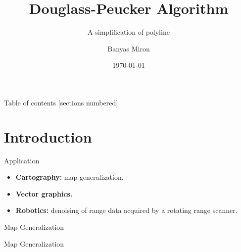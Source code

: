 \documentclass[10pt]{beamer}
\title{Douglass-Peucker Algorithm}
\subtitle{A simplification of polyline}
\date{\today}
\author{Banyas Miron}
\institute{Kyiv Algorithms Club}
\begin{document}
\maketitle

\begin{frame}{Table of contents}
  [sections numbered]
  \tableofcontents[hideallsubsections]
\end{frame}

\section{Introduction}

\begin{frame}{Application}
	\begin{itemize}
		\item \textbf{Cartography:} map generalization.
		\item \textbf{Vector graphics.}
		\item \textbf{Robotics:} denoising of range data acquired by a rotating range scanner. 
	\end{itemize}
\end{frame}

\begin{frame}{Map Generalization}
	\begin{figure}[h]
		\end{figure}
\end{frame}

\begin{frame}{Map Generalization}
	\begin{figure}[h]
		\end{figure}
\end{frame}
\end{document}
